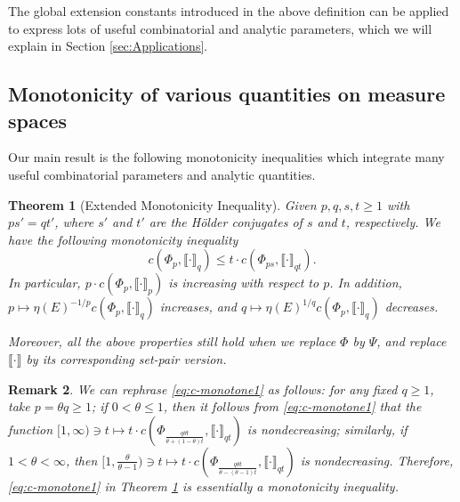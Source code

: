 \documentclass[12pt,a4paper]{article}
\newtheorem{theorem}{Theorem}[section]
\newtheorem{remark}[theorem]{Remark}
\begin{document}
The %
global extension constants introduced in the above definition can be applied to express lots of useful combinatorial and analytic parameters, which we will explain in Section \ref{sec:Applications}. %

\subsection{Monotonicity of various quantities on measure spaces
}

Our main result is the following monotonicity inequalities which integrate many useful combinatorial parameters and analytic quantities. 
\begin{theorem}[Extended Monotonicity Inequality]\label{thm:critical-inequality}
Given $p,q,s,t\ge1$ with $ps'=qt'$, where $s'$ and $t'$ are the H\"older conjugates of $s$ and $t$, respectively.  
We have the following monotonicity inequality 
\begin{equation}\label{eq:c-monotone1}
c(\Phi_p,\llbracket \cdot\rrbracket_{q})\le t\cdot  c(\Phi_{ps},\llbracket \cdot\rrbracket_{qt}).    
\end{equation}
In particular, $p\cdot c(\Phi_p,\llbracket \cdot\rrbracket_{p})$ is increasing with respect to $p$. In addition, $p\mapsto \eta(E)^{-1/p}c(\Phi_p,\llbracket \cdot\rrbracket_{q})$ increases, and $q\mapsto \eta(E)^{1/q}c(\Phi_p,\llbracket \cdot\rrbracket_{q})$ decreases.  

Moreover, all the above properties still hold when we replace $\Phi$ by $\Psi$, and replace $\llbracket \cdot\rrbracket$ by its corresponding set-pair  version. 
\end{theorem}

\begin{remark}
We can rephrase \eqref{eq:c-monotone1} as follows: 
for any fixed $q\ge 1$, take $p=\theta q\ge 1$; if $0<\theta\le1$, then it follows from \eqref{eq:c-monotone1} that the function $[1,\infty)\ni t\mapsto t\cdot c(\Phi_{\frac{q\theta t}{\theta+(1-\theta)t}},\llbracket \cdot\rrbracket_{qt})$ is nondecreasing; similarly, if $1<\theta<\infty$, then $[1,\frac{\theta}{\theta-1})\ni t\mapsto t\cdot c(\Phi_{\frac{q\theta t}{\theta-(\theta-1)t}},\llbracket \cdot\rrbracket_{qt})$ is nondecreasing.  Therefore, \eqref{eq:c-monotone1} in Theorem \ref{thm:critical-inequality} is essentially a monotonicity inequality. 
\end{remark}
\end{document}
